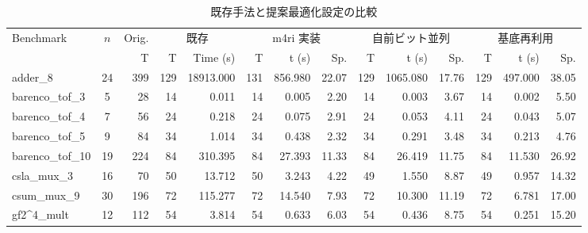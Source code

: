 \begin{table}[htbp]
\centering
\caption{既存手法と提案最適化設定の比較}
\label{tab:optimization_comparison_new}
\scriptsize
\setlength{\tabcolsep}{2.5pt}
\renewcommand{\arraystretch}{1.3}
\begin{tabular}{l c r | r r | r r r | r r r | r r r}
\toprule
\multirow{2}{*}{Benchmark} & \multirow{2}{*}{$n$} & \multicolumn{1}{c|}{Orig.} & \multicolumn{2}{c|}{既存} & \multicolumn{3}{c|}{m4ri 実装} & \multicolumn{3}{c|}{自前ビット並列 } & \multicolumn{3}{c}{基底再利用} \\
\cmidrule(lr){3-3} \cmidrule(lr){4-5} \cmidrule(lr){6-8} \cmidrule(lr){9-11} \cmidrule(lr){12-14}
 & & T & T & Time (s) & T & t (s) & Sp. & T & t (s) & Sp. & T & t (s) & Sp. \\
\midrule
adder\_8 & 24 & 399 & \cellcolor{bestT}129 & 18913.000 & 131 & 856.980 & 22.07 & \cellcolor{bestT}129 & 1065.080 & 17.76 & \cellcolor{bestT}129 & \cellcolor{bestTime}497.000 & \cellcolor{bestTime}38.05 \\
barenco\_tof\_3 & 5 & 28 & \cellcolor{bestT}14 & 0.011 & \cellcolor{bestT}14 & 0.005 & 2.20 & \cellcolor{bestT}14 & 0.003 & 3.67 & \cellcolor{bestT}14 & \cellcolor{bestTime}0.002 & \cellcolor{bestTime}5.50 \\
barenco\_tof\_4 & 7 & 56 & \cellcolor{bestT}24 & 0.218 & \cellcolor{bestT}24 & 0.075 & 2.91 & \cellcolor{bestT}24 & 0.053 & 4.11 & \cellcolor{bestT}24 & \cellcolor{bestTime}0.043 & \cellcolor{bestTime}5.07 \\
barenco\_tof\_5 & 9 & 84 & \cellcolor{bestT}34 & 1.014 & \cellcolor{bestT}34 & 0.438 & 2.32 & \cellcolor{bestT}34 & 0.291 & 3.48 & \cellcolor{bestT}34 & \cellcolor{bestTime}0.213 & \cellcolor{bestTime}4.76 \\
barenco\_tof\_10 & 19 & 224 & \cellcolor{bestT}84 & 310.395 & \cellcolor{bestT}84 & 27.393 & 11.33 & \cellcolor{bestT}84 & 26.419 & 11.75 & \cellcolor{bestT}84 & \cellcolor{bestTime}11.530 & \cellcolor{bestTime}26.92 \\
csla\_mux\_3 & 16 & 70 & 50 & 13.712 & 50 & 3.243 & 4.22 & \cellcolor{bestT}49 & 1.550 & 8.87 & \cellcolor{bestT}49 & \cellcolor{bestTime}0.957 & \cellcolor{bestTime}14.32 \\
csum\_mux\_9 & 30 & 196 & \cellcolor{bestT}72 & 115.277 & \cellcolor{bestT}72 & 14.540 & 7.93 & \cellcolor{bestT}72 & 10.300 & 11.19 & \cellcolor{bestT}72 & \cellcolor{bestTime}6.781 & \cellcolor{bestTime}17.00 \\
gf2\textasciicircum4\_mult & 12 & 112 & \cellcolor{bestT}54 & 3.814 & \cellcolor{bestT}54 & 0.633 & 6.03 & \cellcolor{bestT}54 & 0.436 & 8.75 & \cellcolor{bestT}54 & \cellcolor{bestTime}0.251 & \cellcolor{bestTime}15.20 \\

\end{tabular}
\end{table}
